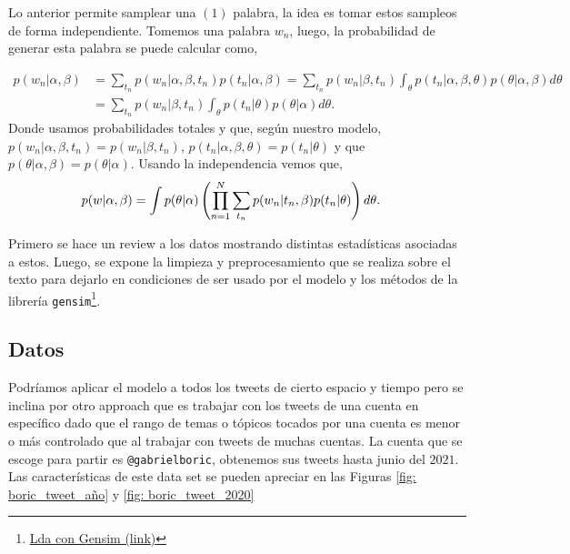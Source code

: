 \documentclass{article}
\begin{document}
	Lo anterior permite samplear una $(1)$ palabra, la idea es tomar estos sampleos de forma independiente. Tomemos una palabra $w_n$, luego, la probabilidad de generar esta palabra se puede calcular como,
	
	\begin{align*}
		p(w_n|\alpha, \beta) &= \sum_{t_n} p(w_n|\alpha,\beta,t_n)p(t_n|\alpha,\beta)
		= \sum_{t_n} p(w_n|\beta,t_n)\int_{\theta}p(t_n|\alpha,\beta,\theta)p(\theta|\alpha,\beta)d\theta\\
		&= \sum_{t_n} p(w_n|\beta,t_n)\int_{\theta}p(t_n|\theta)p(\theta|\alpha)d\theta.
	\end{align*}
	Donde usamos probabilidades totales y que, según nuestro modelo, $p(w_n|\alpha,\beta,t_n)=p(w_n|\beta,t_n)$, $p(t_n|\alpha,\beta,\theta)=p(t_n|\theta)$ y que $p(\theta|\alpha,\beta)=p(\theta|\alpha)$. Usando la independencia vemos que,  
	\begin{align*}
		p(w|\alpha,\beta) &= \int p(\theta|\alpha)\left(\prod_{n=1}^N \sum_{t_n} p(w_n|t_n,\beta)p(t_n|\theta)\right) d\theta.
	\end{align*}
	
	Primero se hace un review a los datos mostrando distintas estadísticas asociadas a estos. Luego, se expone la limpieza y preprocesamiento que se realiza sobre el texto para dejarlo en condiciones de ser usado por el modelo y los métodos de la librería \texttt{gensim}\footnote{\href{https://radimrehurek.com/gensim/models/ldamodel.html}{Lda con Gensim (link)}}. 
	
\subsection{Datos}
	Podríamos aplicar el modelo a todos los tweets de cierto espacio y tiempo pero se inclina por otro approach que es trabajar con los tweets de una cuenta en específico dado que el rango de temas o tópicos tocados por una cuenta es menor o más controlado que al trabajar con tweets de muchas cuentas. La cuenta que se escoge para partir es \texttt{@gabrielboric}, obtenemos sus tweets hasta junio del $2021$. Las características de este data set se pueden apreciar en las Figuras \ref{fig: boric_tweet_año} y \ref{fig: boric_tweet_2020}

	
	
\end{document}
